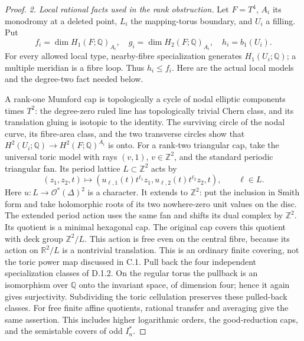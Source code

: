 \begin{proof}
\emph{2. Local rational facts used in the rank obstruction.}
Let $F=T^4$, $A_i$ its monodromy at a deleted point, $L_i$ the
mapping-torus boundary, and $U_i$ a filling. Put
\[
 f_i=\dim H_1(F;\mathbb Q)_{A_i},\quad
 g_i=\dim H_2(F;\mathbb Q)_{A_i},\quad h_i=b_1(U_i).
\]
For every allowed local type, nearby-fibre specialization generates
$H_1(U_i;\mathbb Q)$; a multiple meridian is a fibre loop. Thus
$h_i\le f_i$. Here are the actual local models and the degree-two
fact needed below.

A rank-one Mumford cap is topologically a cycle of nodal elliptic
components times $T^2$: the degree-zero ruled line has topologically
trivial Chern class, and its translation gluing is isotopic to the
identity. The surviving circle of the nodal curve, its fibre-area
class, and the two transverse circles show that
$H^2(U_i;\mathbb Q)\to H^2(F;\mathbb Q)^{A_i}$ is onto.
For a rank-two triangular cap, take the universal toric model with
rays $(v,1)$, $v\in\mathbb Z^2$, and the standard periodic triangular
fan. Its period lattice $L\subset\mathbb Z^2$ acts by
\[
 (z_1,z_2,t)\longmapsto
 (u_{\ell,1}(t)t^{\ell_1}z_1,
  u_{\ell,2}(t)t^{\ell_2}z_2,t),\qquad \ell\in L.
\]
Here $u:L\to\mathcal O^*(\Delta)^2$ is a character. It extends to
$\mathbb Z^2$: put the inclusion in Smith form and take holomorphic
roots of its two nowhere-zero unit values on the disc. The extended
period action uses the same fan and shifts its dual complex by
$\mathbb Z^2$. Its quotient is a minimal hexagonal cap. The original
cap covers this quotient with deck group $\mathbb Z^2/L$. This
action is free even on the central fibre, because its action on
$\mathbb R^2/L$ is a nontrivial translation. This is an ordinary
finite covering, not the toric power map discussed in C.1.
Pull back the four independent specialization classes of D.1.2. On the regular torus
the pullback is an isomorphism over $\mathbb Q$ onto the invariant
space, of dimension four; hence it again gives surjectivity.
Subdividing the toric cellulation preserves these pulled-back classes.
For free finite affine quotients, rational transfer and averaging
give the same assertion. This includes higher logarithmic orders,
the good-reduction caps, and the semistable covers of odd $I_n^*$.


\end{proof}

